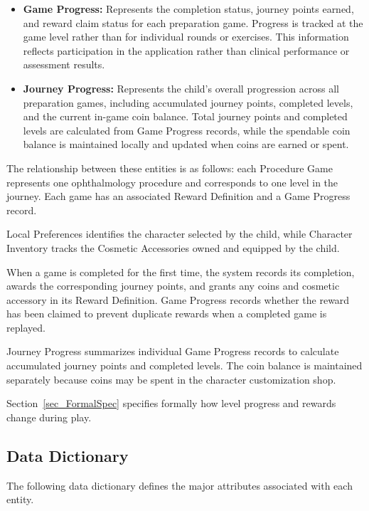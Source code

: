 \documentclass[10pt]{article}
\begin{document}
\begin{itemize}
    \item \textbf{Game Progress:}
    Represents the completion status, journey points
    earned, and reward claim status for each preparation
    game. Progress is tracked at the game level rather
    than for individual rounds or exercises.
    This information reflects participation in the
    application rather than clinical performance
    or assessment results.

    \item \textbf{Journey Progress:}
    Represents the child's overall progression across
    all preparation games, including accumulated journey
    points, completed levels, and the current in-game
    coin balance. Total journey points and completed
    levels are calculated from Game Progress records,
    while the spendable coin balance is maintained
    locally and updated when coins are earned or spent.

\end{itemize}

The relationship between these entities is as follows:
each Procedure Game represents one ophthalmology procedure
and corresponds to one level in the journey. Each game has
an associated Reward Definition and a Game Progress record.

Local Preferences identifies the character selected by the
child, while Character Inventory tracks the Cosmetic
Accessories owned and equipped by the child.

When a game is completed for the first time, the system
records its completion, awards the corresponding journey
points, and grants any coins and cosmetic accessory in
its Reward Definition.
Game Progress records whether the reward has been claimed
to prevent duplicate rewards when a completed game is
replayed.

Journey Progress summarizes individual Game Progress
records to calculate accumulated journey points and
completed levels. The coin balance is maintained
separately because coins may be spent in the
character customization shop.

Section~\ref{sec_FormalSpec} specifies formally how
level progress and rewards change during play.


\subsection{Data Dictionary}

The following data dictionary defines the major
attributes associated with each entity.
\end{document}
